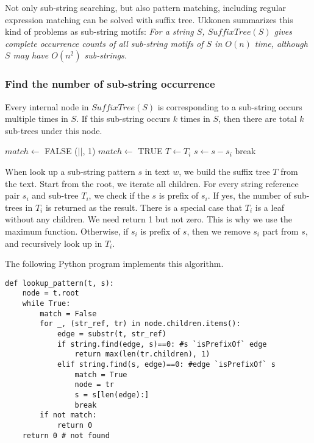 \documentclass[UTF8]{article}
\begin{document}
Not only sub-string searching, but also pattern matching, including
regular expression matching can be solved with suffix tree. Ukkonen
summarizes this kind of problems as sub-string motifs:
{\em For a string $S$, $SuffixTree(S)$ gives complete occurrence
counts of all sub-string motifs of $S$ in $O(n)$ time, although $S$ may have
$O(n^2)$ sub-strings.}

\subsubsection{Find the number of sub-string occurrence}

Every internal node in $SuffixTree(S)$ is corresponding
to a sub-string occurs multiple times in $S$. If this sub-string occurs
$k$ times in $S$, then there are total $k$ sub-trees under this node\cite{ukkonen-lec}.

\begin{algorithmic}[1]
  \Loop
    \State $match \gets$ FALSE
        \State \Return {}($|$$|$, 1)
        \State $match \gets$ TRUE
        \State $T \gets T_i$
        \State $s \gets s - s_i$
        \State break
      \EndIf
    \EndFor
      \State {}
    \EndIf
  \EndLoop
\EndFunction
\end{algorithmic}

When look up a sub-string pattern $s$ in text $w$, we build the suffix tree $T$ from the
text. Start from the root, we iterate all children. For every
string reference pair $s_i$ and sub-tree $T_i$, we check if the $s$ is prefix of $s_i$.
If yes, the number of sub-trees in $T_i$ is returned as the result.
There is a special case that $T_i$ is a leaf without any children. We need return 1 but
not zero. This is why we use the maximum function.
Otherwise, if $s_i$ is prefix of $s$, then we remove $s_i$ part from $s$, and recursively
look up in $T_i$.

The following Python program implements this algorithm.

\lstset{language=Python}
\begin{lstlisting}
def lookup_pattern(t, s):
    node = t.root
    while True:
        match = False
        for _, (str_ref, tr) in node.children.items():
            edge = substr(t, str_ref)
            if string.find(edge, s)==0: #s `isPrefixOf` edge
                return max(len(tr.children), 1)
            elif string.find(s, edge)==0: #edge `isPrefixOf` s
                match = True
                node = tr
                s = s[len(edge):]
                break
        if not match:
            return 0
    return 0 # not found
\end{lstlisting}
\end{document}
